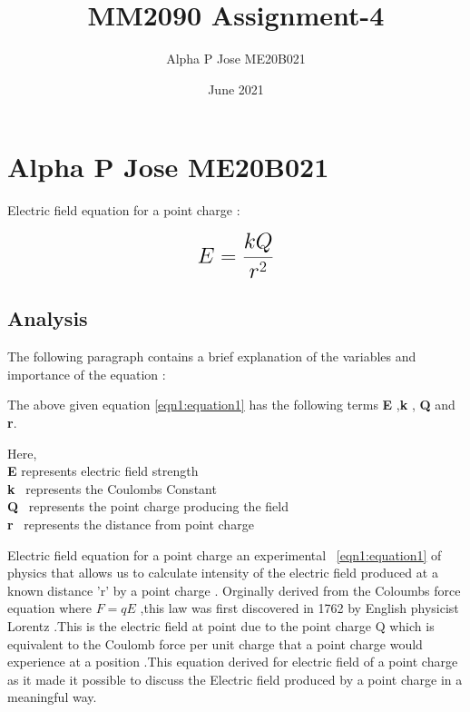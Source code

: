 \documentclass[a4paper, 12pt]{article}
\begin{document}
\title{MM2090 Assignment-4}
\author{Alpha P Jose ME20B021}
\date{June 2021}
\maketitle

\section{Alpha P Jose ME20B021}

Electric field equation for a point charge :  

\begin{equation}
 {\LARGE{\textbf{$E =\frac{kQ}{{r^2}}$}}}
 \label{eqn1:equation1}
\end{equation}


\subsection{Analysis}
The following paragraph contains a brief explanation of the variables and  importance of the equation :
\begin{itemize}

    {\normalsize {The above given equation \ref{eqn1:equation1}  has the following terms \textbf{E} ,\textbf{k} , \textbf{Q} and \textbf{r}.}}

{\normalsize { Here,}}\\
{\normalsize {\textbf{E} represents electric field strength }}\\
{\normalsize {\textbf{k} \  represents the Coulombs Constant}}\\
{\normalsize {\textbf{Q} \  represents the point charge producing the field}}\\
{\normalsize{\textbf{r} \ represents the distance from point charge}}
\end{itemize}


Electric field equation for a point charge an experimental ~\ref{eqn1:equation1} of physics that allows us to calculate intensity of the electric field produced at a known distance 'r' by a point charge . Orginally derived from the Coloumbs force equation where $F=qE$ ,this law was first discovered in 1762 by English physicist Lorentz .This is the electric field at point due to the point charge Q which is equivalent  to the Coulomb force per unit charge that a point charge would experience at a position .This equation derived for electric field of a point charge as it made it possible to discuss the Electric field produced by a point charge in a meaningful way.
\end{document}
